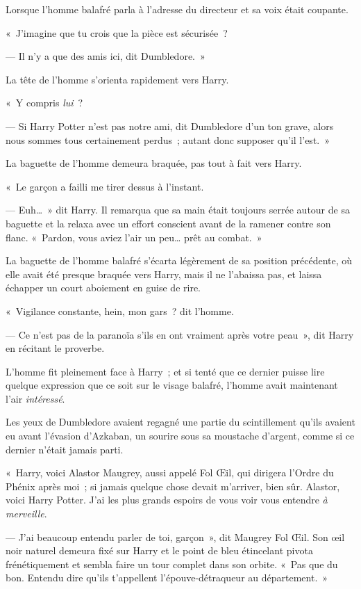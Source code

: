 Lorsque l'homme balafré parla à l'adresse du directeur et sa voix était coupante.

«~J'imagine que tu crois que la pièce est sécurisée~?

--- Il n'y a que des amis ici, dit Dumbledore.~»

La tête de l'homme s'orienta rapidement vers Harry.

«~Y compris \emph{lui}~?

--- Si Harry Potter n'est pas notre ami, dit Dumbledore d'un ton grave, alors nous sommes tous certainement perdus~; autant donc supposer qu'il l'est.~»

La baguette de l'homme demeura braquée, pas tout à fait vers Harry.

«~Le garçon a failli me tirer dessus à l'instant.

--- Euh…~»
dit Harry.
Il remarqua que sa main était toujours serrée autour de sa baguette et la relaxa avec un effort conscient avant de la ramener contre son flanc.
«~Pardon, vous aviez l'air un peu… prêt au combat.~»

La baguette de l'homme balafré s'écarta légèrement de sa position précédente, où elle avait été presque braquée vers Harry, mais il ne l'abaissa pas, et laissa échapper un court aboiement en guise de rire.

«~Vigilance constante, hein, mon gars~? dit l'homme.

--- Ce n'est pas de la paranoïa s'ils en ont vraiment après votre peau~», dit Harry en récitant le proverbe.

L'homme fit pleinement face à Harry~; et si tenté que ce dernier puisse lire quelque expression que ce soit sur le visage balafré, l'homme avait maintenant l'air \emph{intéressé}.

Les yeux de Dumbledore avaient regagné une partie du scintillement qu'ils avaient eu avant l'évasion d'Azkaban, un sourire sous sa moustache d'argent, comme si ce dernier n'était jamais parti.

«~Harry, voici Alastor Maugrey, aussi appelé Fol Œil, qui dirigera l'Ordre du Phénix après moi~; si jamais quelque chose devait m'arriver, bien sûr.
Alastor, voici Harry Potter.
J'ai les plus grands espoirs de vous voir vous entendre \emph{à merveille}.

--- J'ai beaucoup entendu parler de toi, garçon~», dit Maugrey Fol Œil.
Son œil noir naturel demeura fixé sur Harry et le point de bleu étincelant pivota frénétiquement et sembla faire un tour complet dans son orbite.
«~Pas que du bon.
Entendu dire qu'ils t'appellent l'épouve-détraqueur au département.~»

